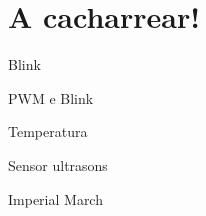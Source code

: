\documentclass{beamer}
\begin{document}
\section{A cacharrear!}
\begin{frame}
\huge{\centerline{\textbf{\color{blue} \insertsection}}}
\end{frame}

\begin{frame}{Blink}

\end{frame}


\begin{frame}{PWM e Blink}

\end{frame}


\begin{frame}{Temperatura}

\end{frame}

\begin{frame}{Sensor ultrasons}

\end{frame}

\begin{frame}{Imperial March}

\end{frame}
%
%
%
%
%
%
\end{document}

